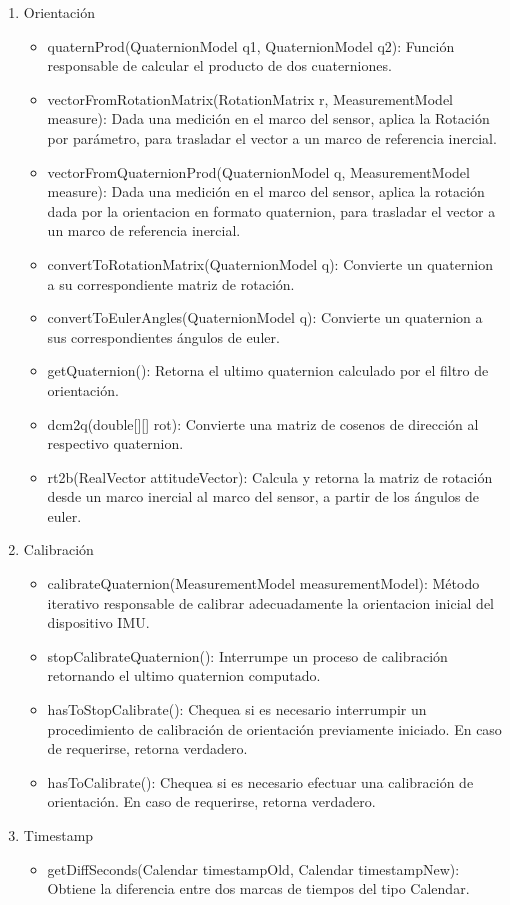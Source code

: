 \begin{enumerate}
\begin{itemize}
\end{itemize}
\item Orientación
\begin{itemize}
    \item quaternProd(QuaternionModel q1, QuaternionModel q2): Función responsable de calcular el producto de dos cuaterniones.
    \item vectorFromRotationMatrix(RotationMatrix r, MeasurementModel measure): Dada una medición en el marco del sensor, aplica la Rotación por parámetro, para trasladar el vector a un marco de referencia inercial.
    \item vectorFromQuaternionProd(QuaternionModel q, MeasurementModel measure): Dada una medición en el marco del sensor, aplica la rotación dada por la orientacion en formato quaternion, para trasladar el vector a un marco de referencia inercial.
    \item convertToRotationMatrix(QuaternionModel q): Convierte un quaternion a su correspondiente matriz de rotación.
    \item convertToEulerAngles(QuaternionModel q): Convierte un quaternion a sus correspondientes ángulos de euler.
    \item getQuaternion(): Retorna el ultimo quaternion calculado por el filtro de orientación.
    \item dcm2q(double[][] rot): Convierte una matriz de cosenos de dirección al respectivo quaternion.
    \item rt2b(RealVector attitudeVector): Calcula y retorna la matriz de rotación desde un marco inercial al marco del sensor, a partir de los ángulos de euler.
\end{itemize}
\item Calibración
\begin{itemize}
  \item calibrateQuaternion(MeasurementModel measurementModel): Método iterativo responsable de calibrar adecuadamente la orientacion inicial del dispositivo IMU.
    \item stopCalibrateQuaternion(): Interrumpe un proceso de calibración retornando el ultimo quaternion computado.
    \item hasToStopCalibrate():  Chequea si es necesario interrumpir un procedimiento de calibración de orientación previamente iniciado. En caso de requerirse, retorna verdadero.
    \item hasToCalibrate(): Chequea si es necesario efectuar una calibración de orientación. En caso de requerirse, retorna verdadero.
\end{itemize}
\item Timestamp
\begin{itemize}
  \item getDiffSeconds(Calendar timestampOld, Calendar timestampNew): Obtiene la diferencia entre dos marcas de tiempos del tipo Calendar. 
\end{itemize}
\end{enumerate}


